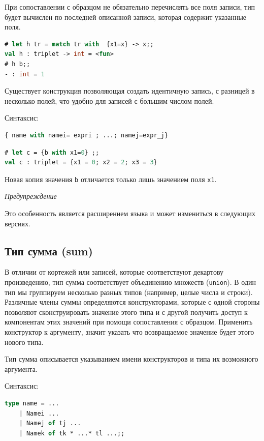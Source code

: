 При сопоставлении с образцом не обязательно перечислять все поля записи, тип
будет вычислен по последней описанной записи, которая содержит указанные поля.

\begin{lstlisting}[language=OCaml]
# let h tr = match tr with  {x1=x} -> x;;
val h : triplet -> int = <fun>
# h b;;
- : int = 1
\end{lstlisting}

Существует конструкция позволяющая создать идентичную запись, с разницей в
несколько полей, что удобно для записей с большим числом полей.

Синтаксис:

\begin{lstlisting}[language=OCaml]
{ name with namei= expri ; ...; namej=expr_j}
\end{lstlisting}

\begin{lstlisting}[language=OCaml]
# let c = {b with x1=0} ;;
val c : triplet = {x1 = 0; x2 = 2; x3 = 3}
\end{lstlisting}

Новая копия значения \texttt{b} отличается только лишь значением поля
\texttt{x1}.

{\it Предупреждение}

Это особенность является расширением языка и может измениться в следующих
версиях.

\subsection{Тип сумма (sum)}

В отличии от кортежей или записей, которые соответствуют декартову
произведению, тип сумма соответствует объединению множеств (\texttt{union}). В
один тип мы группируем несколько разных типов (например, целые числа и строки).
Различные члены суммы определяются конструкторами, которые с одной стороны
позволяют сконструировать значение этого типа и с другой получить доступ к
компонентам этих значений при помощи сопоставления с образцом. Применить
конструктор к аргументу, значит указать что возвращаемое значение будет этого
нового типа.

Тип сумма описывается указыванием имени конструкторов и типа их возможного
аргумента.

Синтаксис:

\begin{lstlisting}[language=OCaml]
type name = ...
    | Namei ...
    | Namej of tj ...
    | Namek of tk * ...* tl ...;;
\end{lstlisting}

